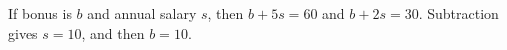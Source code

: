 If bonus is $b$ and annual salary $s$, then $b+5s=60$ and $b+2s=30$. Subtraction gives $s=10$, and then $\boxed{b=10}$.
